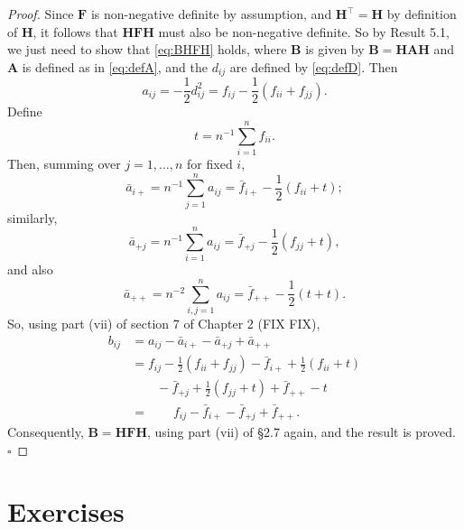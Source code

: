 \documentclass[]{book}
\theoremstyle{definition}
\theoremstyle{definition}
\theoremstyle{definition}
\theoremstyle{remark}
\begin{document}
\begin{proof}
{}Since \(\boldsymbol F\) is non-negative definite by assumption, and \(\boldsymbol H^\top =\boldsymbol H\) by definition of \(\boldsymbol H\), it follows that \(\boldsymbol H\boldsymbol F\boldsymbol H\) must also be non-negative definite. So by Result 5.1, we just need to show that \eqref{eq:BHFH} holds, where \(\boldsymbol B\) is given by \(\boldsymbol B=\boldsymbol H\boldsymbol A\boldsymbol H\) and \(\boldsymbol A\) is defined as in \eqref{eq:defA}, and the \(d_{ij}\) are defined by \eqref{eq:defD}. Then
\[
a_{ij}=-\frac{1}{2}d_{ij}^2 =f_{ij}-\frac{1}{2}(f_{ii}+f_{jj}).
\]
Define
\[
t=n^{-1}\sum_{i=1}^n f_{ii}.
\]
Then, summing over \(j=1, \ldots , n\) for fixed \(i\),
\[
\bar{a}_{i+}=n^{-1}\sum_{j=1}^n a_{ij} = \bar{f}_{i+}-\frac{1}{2}(f_{ii}+t);
\]
similarly,
\[
\bar{a}_{+j}=n^{-1}\sum_{i=1}^n a_{ij}=\bar{f}_{+j}-\frac{1}{2}(f_{jj}+t),
\]
and also
\[
\bar{a}_{++}=n^{-2}\sum_{i,j=1}^n a_{ij}=\bar{f}_{++}-\frac{1}{2}(t+t).
\]
So, using part (vii) of section 7 of Chapter 2 (FIX FIX),
\begin{align*} 
b_{ij}&=a_{ij}-\bar{a}_{i+}-\bar{a}_{+j}+\bar{a}_{++}\\
&=f_{ij}-\frac{1}{2}(f_{ii}+f_{jj})-\bar{f}_{i+}+\frac{1}{2}(f_{ii}+t)\\
& \qquad -\bar{f}_{+j}+\frac{1}{2}(f_{jj}+t) +\bar{f}_{++}-t\\
& =\qquad f_{ij}-\bar{f}_{i+}-\bar{f}_{+j}+\bar{f}_{++}.
\end{align*}
Consequently, \(\boldsymbol B=\boldsymbol H\boldsymbol F\boldsymbol H\), using part (vii) of \S 2.7 again, and the result is proved.
\hfill\(\square\)
\end{proof}

\hypertarget{exercises-3}{%
\section{Exercises}\label{exercises-3}}
\end{document}
